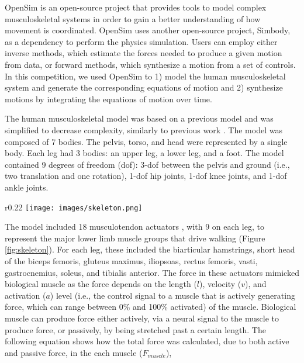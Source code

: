\documentclass[graybox]{svmult}
\begin{document}
OpenSim is an open-source project that provides tools to model complex musculoskeletal systems in order to gain a better understanding of how movement is coordinated. OpenSim uses another open-source project, Simbody, as a dependency to perform the physics simulation. Users can employ either inverse methods, which estimate the forces needed to produce a given motion from data, or forward methods, which synthesize a motion from a set of controls. In this competition, we used OpenSim to 1) model the human musculoskeletal system and generate the corresponding equations of motion and 2) synthesize motions by integrating the equations of motion over time.

The human musculoskeletal model was based on a previous model \cite{delp1990model} and was simplified to decrease complexity, similarly to previous work \cite{ong2017walking}. The model was composed of 7 bodies. The pelvis, torso, and head were represented by a single body. Each leg had 3 bodies: an upper leg, a lower leg, and a foot. The model contained 9 degrees of freedom (dof): 3-dof between the pelvis and ground (i.e., two translation and one rotation), 1-dof hip joints, 1-dof knee joints, and 1-dof ankle joints. 

\begin{wrapfigure}[37]{r}{0.22\textwidth}
  \centering
  \texttt{[image: images/skeleton.png]}
  \caption{Musculoskeletal model in OpenSim used in this competition. Red/purple curves indicate muscles, while blue balls attached to feet model contact.}
  \label{fig:skeleton}
\end{wrapfigure}

The model included 18 musculotendon actuators \cite{thelen2003muscle}, with 9 on each leg, to represent the major lower limb muscle groups that drive walking (Figure \ref{fig:skeleton}). For each leg, these included the biarticular hamstrings, short head of the biceps femoris, gluteus maximus, iliopsoas, rectus femoris, vasti, gastrocnemius, soleus, and tibialis anterior. The force in these actuators mimicked biological muscle as the force depends on the length ($l$), velocity ($v$), and activation ($a$) level (i.e., the control signal to a muscle that is actively generating force, which can range between 0\% and 100\% activated) of the muscle. Biological muscle can produce force either actively, via a neural signal to the muscle to produce force, or passively, by being stretched past a certain length. The following equation shows how the total force was calculated, due to both active and passive force, in the each muscle ($F_{muscle}$),
\end{document}
